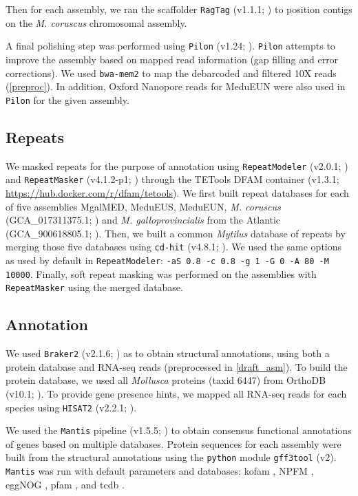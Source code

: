 \documentclass[11pt, a4paper]{article}
\begin{document}
Then for each assembly, we ran the scaffolder \texttt{RagTag} (v1.1.1; \cite{Alonge2021}) to position contigs on the \emph{M. coruscus} chromosomal assembly.

A final polishing step was performed using \texttt{Pilon} (v1.24; \cite{Walker2014}).
\texttt{Pilon} attempts to improve the assembly based on mapped read information (gap filling and error corrections).
We used \texttt{bwa-mem2} to map the debarcoded and filtered 10X reads (\cref{preproc}).
In addition, Oxford Nanopore reads for MeduEUN were also used in \texttt{Pilon} for the given assembly.

\subsection{Repeats}

We masked repeats for the purpose of annotation using \texttt{RepeatModeler} (v2.0.1; \cite{Flynn2020}) and \texttt{RepeatMasker} (v4.1.2-p1; \cite{Smit2013}) through the TETools DFAM container (v1.3.1; \url{https://hub.docker.com/r/dfam/tetools}).
We first built repeat databases for each of five assemblies MgalMED, MeduEUS, MeduEUN, \textit{M. coruscus} (GCA\_017311375.1; \cite{Yang2021}) and \textit{M. galloprovincialis} from the Atlantic (GCA\_900618805.1; \cite{Gerdol2020}).
Then, we built a common \textit{Mytilus} database of repeats by merging those five databases using \texttt{cd-hit} (v4.8.1; \cite{Fu2012}). We used the same options as used by default in \texttt{RepeatModeler}: \texttt{-aS 0.8 -c 0.8 -g 1 -G 0 -A 80 -M 10000}.
Finally, soft repeat masking was performed on the assemblies with \texttt{RepeatMasker} using the merged database.

\subsection{Annotation}

We used \texttt{Braker2} (v2.1.6; \cite{Bruna2021}) as to obtain structural annotations, using both a protein database and RNA-seq reads (preprocessed in \cref{draft_asm}).
To build the protein database, we used all \textit{Mollusca} proteins (taxid 6447) from OrthoDB (v10.1; \cite{Kriventseva2019}).
To provide gene presence hints, we mapped all RNA-seq reads for each species using \texttt{HISAT2} (v2.2.1; \cite{Kim2019}).

We used the \texttt{Mantis} pipeline (v1.5.5; \cite{Queiros2021}) to obtain consensus functional annotations of genes based on multiple databases.
Protein sequences for each assembly were built from the structural annotations using the \texttt{python} module \texttt{gff3tool} (v2).
\texttt{Mantis} was run with default parameters and databases:
kofam \parencite{Aramaki2020}, NPFM \parencite{Lu2020}, eggNOG \parencite{Huerta-Cepas2019}, pfam \parencite{El-Gebali2019}, and tcdb \parencite{Saier2021}.
\end{document}
